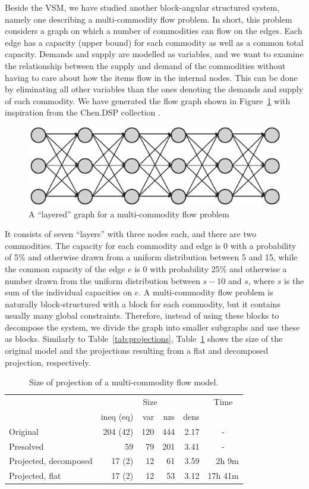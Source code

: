 \documentclass{llncs}
\newcommand{\btablesize}{\begin{scriptsize}}
\newcommand{\etablesize}{\end{scriptsize}}
\begin{document}
Beside the VSM, we have studied another block-angular structured system, namely one describing a multi-commodity flow problem.  
In short, this problem considers a graph on which a number of commodities can flow on the edges. Each edge has a capacity (upper bound) for each commodity as well as a common total capacity. Demands and supply are modelled as variables, and we want to examine the relationship between the supply and demand of the commodities without having to care about how the items flow in the internal nodes. This can be done by eliminating all other variables than the ones denoting the demands and supply of each commodity. We have generated the flow graph shown in Figure~\ref{fig:multiflow} with inspiration from the Chen.DSP collection \cite{JLFP93}. 
\begin{figure}[tb]
	\centering
		\includegraphics[scale=0.6]{figures/multiflow2.pdf}
	\caption{A ``layered''  graph for a multi-commodity flow problem}
	\label{fig:multiflow}
\end{figure}
It consists of seven ``layers'' with three nodes each, and there are two commodities. The capacity for each commodity and edge is 0 with a probability of 5\% and otherwise drawn from a uniform distribution between 5 and 15, while the common capacity of the edge $e$ is 0 with probability 25\% and otherwise a number drawn from the uniform distribution between $s-1$0 and $s$, where $s$ is the sum of the individual capacities on $e$. A multi-commodity flow problem is naturally block-structured with a block for each commodity, but it contains usually many global constraints. Therefore, instead of using these blocks to decompose the system, we divide the graph into smaller subgraphs and use these as blocks. 
%
Similarly to Table~\ref{tab:projections}, Table~\ref{tab:multicom} shows the size of the original model and the projections resulting from a flat and decomposed projection, respectively. 
\begin{table}[tb]
\caption{Size of projection of a multi-commodity flow model.}
\label{tab:multicom}
\centering
\btablesize
\begin{tabular}{l|r@{ / }r@{ / }r@{ / }r|r}
&\multicolumn{4}{c|}{Size}&\multicolumn{1}{c}{Time}\\
											&ineq (eq)&var &nzs &dens&\\
\hline
Original							&204 (42) & 120& 444&2.17&\multicolumn{1}{c}{-}\\
Presolved							& 59		  &  79& 201&3.41&\multicolumn{1}{c}{-}\\
Projected, decomposed	& 17 (2)  &  12&  61&3.59& 2h \phantom{9}9m \\
Projected, flat				& 17 (2)  &  12&  53&3.12& 17h 41m\\
\end{tabular}
\etablesize
\end{table}
\end{document}
